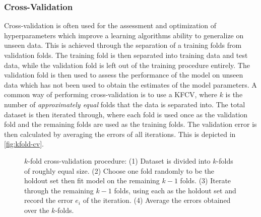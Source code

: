 

\subsubsection{Cross-Validation}
Cross-validation is often used for the assessment and optimization of
hyperparameters which improve a learning algorithms ability to generalize on
unseen data. This is achieved through the separation of a training folds from
validation folds. The training fold is then separated into training data and
test data, while the validation fold is left out of the training procedure
entirely. The validation fold is then used to assess the performance of the
model on unseen data which has not been used to obtain the estimates of the
model parameters. A common way of performing cross-validation is to use a
\gls{KFCV}, where $k$ is the number of \textit{approximately
equal} folds that the data is separated into. The total dataset is then iterated
through, where each fold is used once as the validation fold and the remaining
folds are used as the training folds. The validation error is then calculated by
averaging the errors of all iterations. This is depicted in
\autoref{fig:kfold-cv}. \cite[p.~241-245]{hastie2009elements}


\begin{figure}[htbp]
    \centering
    
    \captionsetup{format=hang} %
    \caption{
        $k$-fold cross-validation procedure: (1) Dataset is divided into
        $k$-folds of roughly equal size. (2) Choose one fold randomly to be the
        holdout set then fit model on the remaining $k-1$ folds. (3) Iterate
        through the remaining $k-1$ folds, using each as the holdout set and
        record the error $e_i$ of the iteration. (4) Average the errors obtained
        over the $k$-folds.
    }
    \label{fig:kfold-cv}
\end{figure}

